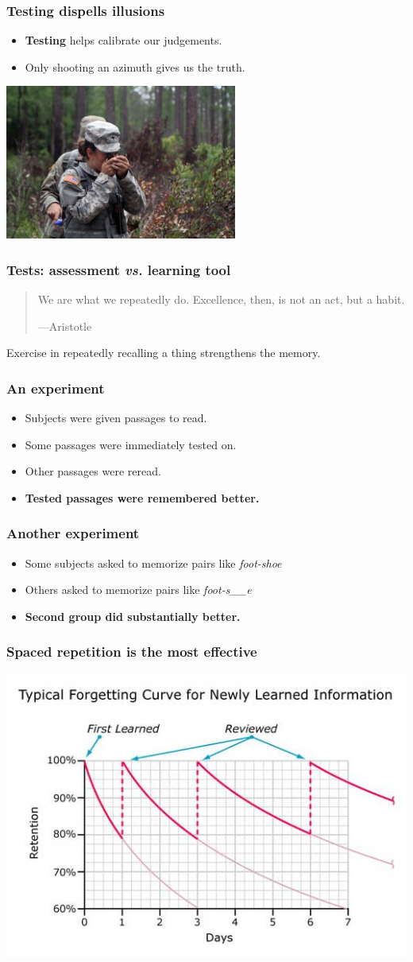\documentclass{beamer}
\newcommand{\bi}{\begin{itemize}}
\newcommand{\li}{\item}
\newcommand{\ei}{\end{itemize}}
\newcommand{\bfr}[1]{\begin{frame}[fragile]\frametitle{{ #1 }}}
\begin{document}
\bfr{Testing dispells illusions}
\bi
\li {\bf Testing} helps calibrate our judgements.
\li Only shooting an azimuth gives us the truth.
\ei
\centerline{\includegraphics[width=3in]{shootinganazimuth.jpg}}
\end{frame}

\bfr{Tests: assessment {\em vs.} learning tool}


\begin{quotation}
We are what we repeatedly do. Excellence, then, is not an act, but a habit.

\hfill ---Aristotle
\end{quotation}

\vfill


 Exercise in repeatedly recalling a thing strengthens the memory.

\vfill
\end{frame}

\bfr{An experiment}
\bi
\li Subjects were given passages to read.
\li Some passages were immediately tested on.
\li Other passages were reread.
\li {\bf Tested passages were remembered better.}
\ei
\end{frame}

\bfr{Another experiment}
\bi
\li Some subjects asked to memorize pairs like {\em foot-shoe}
\li Others asked to memorize pairs like {\em foot-s\_\_e}
\li {\bf Second group did substantially better.}
\ei
\end{frame}
\bfr{}
\centerline{\huge{}}
\end{frame}

\bfr{Spaced repetition is the most effective}
\begin{center}
\includegraphics[width=\textwidth]{ForgettingCurve.jpg}
\end{center}
\end{frame}
\end{document}
